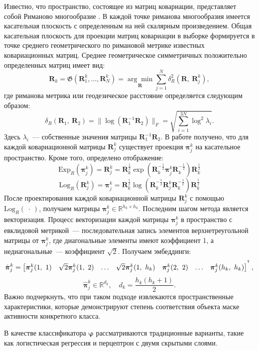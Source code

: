 Известно, что пространство, состоящее из матриц ковариации, представляет собой 
Риманово многообразие \citep{barachant2010riemannian}. 
В каждой точке риманова многообразия имеется касательная плоскость с 
определенным на ней скалярным произведением. Общая касательная плоскость для проекции матриц ковариации в выборке формируется в точке среднего геометрического по римановой метрике 
известных ковариационных матриц. Среднее геометрическое симметричных положительно определенных матриц \citep{moakher2005differential} имеет вид:
$$\bm{R}_k = \mathfrak{G}\left(\bm{R}^k_1,\dots,\bm{R}^k_N\right) = \underset{\bm{R}}{\arg \min}\sum_{j = 1}^N
\delta^2_R(\bm{R},~\bm{R}^k_j),$$
где риманова метрика или геодезическое расстояние определяется следующим образом:
$$\delta_R(\bm{R}_1,~\bm{R}_2) = \|\log (\bm{R}_1^{-1}\bm{R}_2)\|_F = \sqrt{\sum_{i = 1}^{3N} \log^2\lambda_i}.$$
Здесь $\lambda_i$~--- собственные значения матрицы $\bm{R}_1^{-1}\bm{R}_2$. В работе \citep{barachant2010riemannian}
получено, что для каждой ковариационной матрицы $\bm{R}^k_j$ существует проекция $\bm{\pi}^k_j$ на касательное пространство.
Кроме того, определено отображение:
$$\text{Exp}_{R}(\bm{\pi}^k_j) = \bm{R}^k_j = \bm{R}_k^{\frac{1}{2}} \exp\left(\bm{R}_k^{-\frac{1}{2}}\bm{\pi}^k_j\bm{R}_k^{-\frac{1}{2}}\right) \bm{R}_k^{\frac{1}{2}}$$
$$\text{Log}_{R}(\bm{R}^k_j) = \bm{\pi}^k_j = \bm{R}_k^{\frac{1}{2}} \log\left(\bm{R}_k^{-\frac{1}{2}}\bm{R}^k_j\bm{R}_k^{-\frac{1}{2}}\right) \bm{R}_k^{\frac{1}{2}}$$
После проектирования каждой ковариационной матрицы $\bm{R}^k_j$ с помощью $\text{Log}_{R}(~\cdot~)$, получаем
матрицы $\bm{\pi}^k_j \in \mathbb{R}^{h_k\times h_k}$. 
Последним шагом метода является векторизация.
Процесс векторизации каждой матрицы $\bm{\pi}^k_j$ в пространство с евклидовой метрикой~---
последовательная запись элементов верхнетреугольной матрицы от $\bm{\pi}^k_j$, 
где диагональные элементы имеют коэффициент 1, а недиагональные~--- коэффициент $\sqrt{2}$. 
Получаем эмбеддинги:
\begin{equation*}
	\hat{\bm{\pi}}^k_j = \begin{bmatrix}
		\bm{\bm{\pi}}^k_j({1,~1}) & \sqrt{2} \bm{\pi}^k_j({1,~2}) &  \ldots  &  \sqrt{2}\bm{\pi}^k_j(1,~h_k) & \bm{\pi}^k_j({2,~2}) & \ldots & \bm{\pi}^k_j({h_k,~h_k})
		\end{bmatrix}^{^{\text{\tiny\sffamily\upshape\mdseries T}}},
\end{equation*}
\[\hat{\bm{\pi}}^k_j \in \mathbb{R}^{d_k},\quad d_k = \dfrac{h_k(h_k+1)}{2}.\]
Важно подчеркнуть, что при таком подходе извлекаются пространственные характеристики, которые демонстрируют степень соответствия объекта маске активности конкретного класса.

В качестве классификатора $\bm{\varphi}$ рассматриваются традиционные варианты, такие как логистическая регрессия и перцептрон с двумя скрытыми слоями.
\newpage
